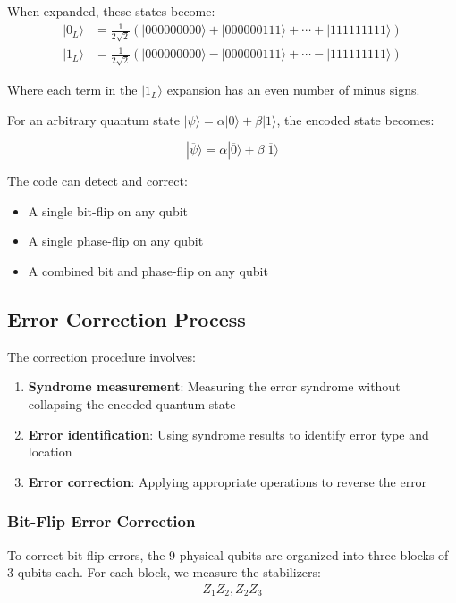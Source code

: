 \documentclass[12pt,a4paper]{article}
\begin{document}
When expanded, these states become:
\begin{align}
|0_L\rangle &= \frac{1}{2\sqrt{2}}(|000000000\rangle + |000000111\rangle + \cdots + |111111111\rangle) \\
|1_L\rangle &= \frac{1}{2\sqrt{2}}(|000000000\rangle - |000000111\rangle + \cdots - |111111111\rangle)
\end{align}

Where each term in the $|1_L\rangle$ expansion has an even number of minus signs.

For an arbitrary quantum state $|\psi\rangle = \alpha|0\rangle + \beta|1\rangle$, the encoded state becomes:

\begin{equation}
    |\overline{\psi}\rangle = \alpha|\overline{0}\rangle + \beta|\overline{1}\rangle
\end{equation}

The code can detect and correct:
\begin{itemize}
    \item A single bit-flip on any qubit
    \item A single phase-flip on any qubit
    \item A combined bit and phase-flip on any qubit
\end{itemize}

\subsection{Error Correction Process}

The correction procedure involves:

\begin{enumerate}
    \item \textbf{Syndrome measurement}: Measuring the error syndrome without collapsing the encoded quantum state
    \item \textbf{Error identification}: Using syndrome results to identify error type and location
    \item \textbf{Error correction}: Applying appropriate operations to reverse the error
\end{enumerate}

\subsubsection{Bit-Flip Error Correction}

To correct bit-flip errors, the 9 physical qubits are organized into three blocks of 3 qubits each. For each block, we measure the stabilizers:
\begin{align}
Z_1Z_2, Z_2Z_3
\end{align}
\end{document}

